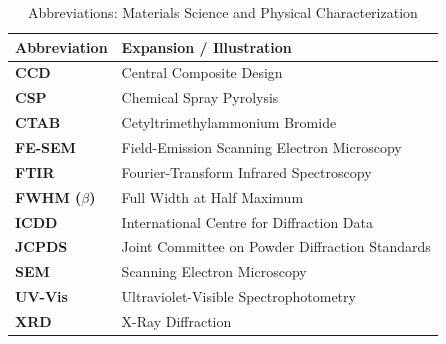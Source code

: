 \documentclass[12pt,a4paper,oneside]{report}
\begin{document}
{{{\begin{table}[!htbp]
\centering
\footnotesize
\setlength{\tabcolsep}{6pt}
\renewcommand{\arraystretch}{1}
\caption{Abbreviations: Materials Science and Physical Characterization}
\label{tab:abbrev_materials}
\begin{tabular}{|p{3.2cm}|p{11.2cm}|}
\hline
\textbf{Abbreviation} & \textbf{Expansion / Illustration} \\
\hline
\textbf{CCD} & Central Composite Design \\
\textbf{CSP} & Chemical Spray Pyrolysis \\
\textbf{CTAB} & Cetyltrimethylammonium Bromide \\
\textbf{FE-SEM} & Field-Emission Scanning Electron Microscopy \\
\textbf{FTIR} & Fourier-Transform Infrared Spectroscopy \\
\textbf{FWHM ($\beta$)} & Full Width at Half Maximum \\
\textbf{ICDD} & International Centre for Diffraction Data \\
\textbf{JCPDS} & Joint Committee on Powder Diffraction Standards \\
\textbf{SEM} & Scanning Electron Microscopy \\
\textbf{UV-Vis} & Ultraviolet-Visible Spectrophotometry \\
\textbf{XRD} & X-Ray Diffraction \\
\hline
\end{tabular}
\end{table}

}}}
\end{document}
